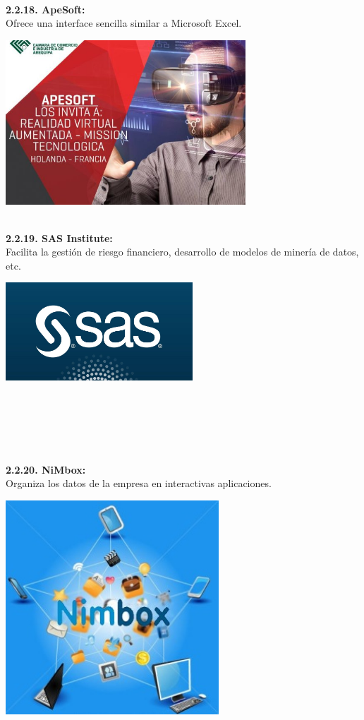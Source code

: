 \begin{flushleft}
\textbf{}\\
\textbf{2.2.18. ApeSoft: }\\
Ofrece una interface sencilla similar a Microsoft Excel.
	\begin{center}
	\includegraphics[width=9cm]{./Imagenes/BIimagen18}
	\end{center}
\textbf{}\\
	
\textbf{2.2.19. SAS Institute: }\\ 
Facilita la gestión de riesgo financiero, desarrollo de modelos de minería de datos, etc.
	\begin{center}
	\includegraphics[width=7cm]{./Imagenes/BIimagen19}
	\end{center}
\textbf{}\\
	\textbf{}\\
\textbf{}\\
\textbf{}\\
\textbf{}\\
\textbf{2.2.20. NiMbox: }\\
Organiza los datos de la empresa en interactivas aplicaciones.
	\begin{center}
	\includegraphics[width=8cm]{./Imagenes/BIimagen20}
	\end{center}







\textbf{}\\
\end{flushleft}